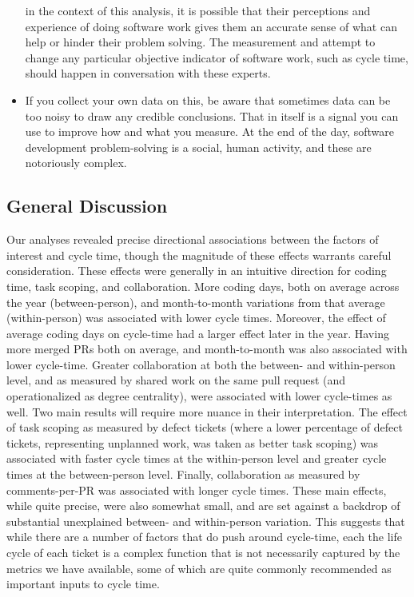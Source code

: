 \documentclass[manuscript,screen,review]{acmart}
\begin{document}
\begin{itemize}
  in the context of this analysis, it is possible that their perceptions
  and experience of doing software work gives them an accurate sense of
  what can help or hinder their problem solving. The measurement and
  attempt to change any particular objective indicator of software work,
  such as cycle time, should happen in conversation with these experts.
\item
  If you collect your own data on this, be aware that sometimes data can
  be too noisy to draw any credible conclusions. That in itself is a
  signal you can use to improve how and what you measure. At the end of
  the day, software development problem-solving is a social, human
  activity, and these are notoriously complex.
\end{itemize}

\subsection{General Discussion}\label{general-discussion}

Our analyses revealed precise directional associations between the
factors of interest and cycle time, though the magnitude of these
effects warrants careful consideration. These effects were generally in
an intuitive direction for coding time, task scoping, and collaboration.
More coding days, both on average across the year (between-person), and
month-to-month variations from that average (within-person) was
associated with lower cycle times. Moreover, the effect of average
coding days on cycle-time had a larger effect later in the year. Having
more merged PRs both on average, and month-to-month was also associated
with lower cycle-time. Greater collaboration at both the between- and
within-person level, and as measured by shared work on the same pull
request (and operationalized as degree centrality), were associated with
lower cycle-times as well. Two main results will require more nuance in
their interpretation. The effect of task scoping as measured by defect
tickets (where a lower percentage of defect tickets, representing
unplanned work, was taken as better task scoping) was associated with
faster cycle times at the within-person level and greater cycle times at
the between-person level. Finally, collaboration as measured by
comments-per-PR was associated with longer cycle times. These main
effects, while quite precise, were also somewhat small, and are set
against a backdrop of substantial unexplained between- and within-person
variation. This suggests that while there are a number of factors that
do push around cycle-time, each the life cycle of each ticket is a
complex function that is not necessarily captured by the metrics we have
available, some of which are quite commonly recommended as important
inputs to cycle time.
\end{document}
